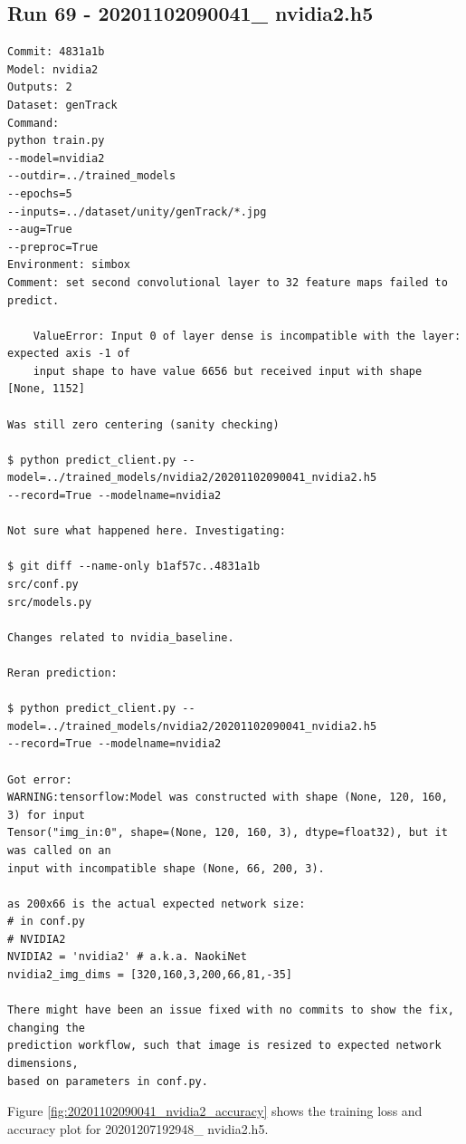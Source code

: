 \subsection{Run 69 - 20201102090041\_ nvidia2.h5}
\label{app_res:69}
\begin{verbatim}
Commit: 4831a1b
Model: nvidia2
Outputs: 2
Dataset: genTrack
Command:
python train.py
--model=nvidia2
--outdir=../trained_models
--epochs=5
--inputs=../dataset/unity/genTrack/*.jpg
--aug=True
--preproc=True
Environment: simbox
Comment: set second convolutional layer to 32 feature maps failed to predict.

    ValueError: Input 0 of layer dense is incompatible with the layer: expected axis -1 of
    input shape to have value 6656 but received input with shape [None, 1152]

Was still zero centering (sanity checking)

$ python predict_client.py --model=../trained_models/nvidia2/20201102090041_nvidia2.h5 
--record=True --modelname=nvidia2

Not sure what happened here. Investigating:

$ git diff --name-only b1af57c..4831a1b
src/conf.py
src/models.py

Changes related to nvidia_baseline.

Reran prediction:

$ python predict_client.py --model=../trained_models/nvidia2/20201102090041_nvidia2.h5
--record=True --modelname=nvidia2

Got error:
WARNING:tensorflow:Model was constructed with shape (None, 120, 160, 3) for input
Tensor("img_in:0", shape=(None, 120, 160, 3), dtype=float32), but it was called on an
input with incompatible shape (None, 66, 200, 3).

as 200x66 is the actual expected network size:
# in conf.py
# NVIDIA2
NVIDIA2 = 'nvidia2' # a.k.a. NaokiNet
nvidia2_img_dims = [320,160,3,200,66,81,-35]

There might have been an issue fixed with no commits to show the fix, changing the 
prediction workflow, such that image is resized to expected network dimensions,
based on parameters in conf.py.
\end{verbatim}

Figure \ref{fig:20201102090041_nvidia2_accuracy} 
shows the training loss and accuracy plot for 20201207192948\_ nvidia2.h5.

